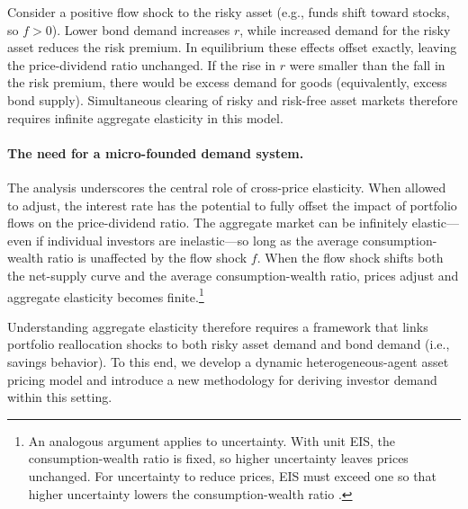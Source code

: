 Consider a positive flow shock to the risky asset (e.g., funds shift toward stocks, so $f>0$).
Lower bond demand increases $r$, while increased demand for the risky asset reduces the risk premium.
In equilibrium these effects offset exactly, leaving the price-dividend ratio unchanged.
If the rise in $r$ were smaller than the fall in the risk premium, there would be excess demand for goods (equivalently, excess bond supply).
Simultaneous clearing of risky and risk-free asset markets therefore requires infinite aggregate elasticity in this model.

\paragraph{The need for a micro-founded demand system.}
The analysis underscores the central role of cross-price elasticity.
When allowed to adjust, the interest rate has the potential to fully offset the impact of portfolio flows on the price-dividend ratio.
The aggregate market can be infinitely elastic—even if individual investors are inelastic—so long as the average consumption-wealth ratio is unaffected by the flow shock $f$.
When the flow shock shifts both the net-supply curve and the average consumption-wealth ratio, prices adjust and aggregate elasticity becomes finite.\footnote{
    An analogous argument applies to uncertainty.
    With unit EIS, the consumption-wealth ratio is fixed, so higher uncertainty leaves prices unchanged.    
    For uncertainty to reduce prices, EIS must exceed one so that higher uncertainty lowers the consumption-wealth ratio \citep[see][]{bansal2004risks}.}

Understanding aggregate elasticity therefore requires a framework that links portfolio reallocation shocks to both risky asset demand and bond demand (i.e., savings behavior).
To this end, we develop a dynamic heterogeneous-agent asset pricing model and introduce a new methodology for deriving investor demand within this setting.

